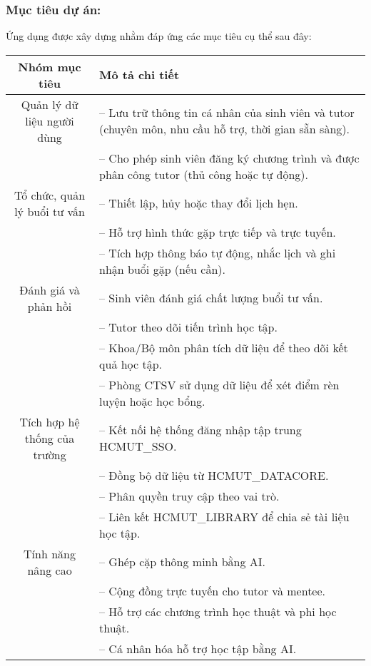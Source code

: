 \newpage

\subsubsection{Mục tiêu dự án:}
Ứng dụng được xây dựng nhằm đáp ứng các mục tiêu cụ thể sau đây:
\renewcommand{\arraystretch}{1.4} %
\begin{table}[H]
\centering
\begin{tabular}{|c|p{9.5cm}|}
\hline
\textbf{Nhóm mục tiêu} & \textbf{Mô tả chi tiết} \\
\hline
Quản lý dữ liệu người dùng &
-- Lưu trữ thông tin cá nhân của sinh viên và tutor (chuyên môn, nhu cầu hỗ trợ, thời gian sẵn sàng).\\
& -- Cho phép sinh viên đăng ký chương trình và được phân công tutor (thủ công hoặc tự động). \\
\hline
Tổ chức, quản lý buổi tư vấn &
-- Thiết lập, hủy hoặc thay đổi lịch hẹn.\\
& -- Hỗ trợ hình thức gặp trực tiếp và trực tuyến.\\
& -- Tích hợp thông báo tự động, nhắc lịch và ghi nhận buổi gặp (nếu cần). \\
\hline
Đánh giá và phản hồi &
-- Sinh viên đánh giá chất lượng buổi tư vấn.\\
& -- Tutor theo dõi tiến trình học tập.\\
& -- Khoa/Bộ môn phân tích dữ liệu để theo dõi kết quả học tập.\\
& -- Phòng CTSV sử dụng dữ liệu để xét điểm rèn luyện hoặc học bổng. \\
\hline
Tích hợp hệ thống của trường &
-- Kết nối hệ thống đăng nhập tập trung HCMUT\_SSO.\\
& -- Đồng bộ dữ liệu từ HCMUT\_DATACORE.\\
& -- Phân quyền truy cập theo vai trò.\\
& -- Liên kết HCMUT\_LIBRARY để chia sẻ tài liệu học tập. \\
\hline
Tính năng nâng cao &
-- Ghép cặp thông minh bằng AI.\\
& -- Cộng đồng trực tuyến cho tutor và mentee.\\
& -- Hỗ trợ các chương trình học thuật và phi học thuật.\\
& -- Cá nhân hóa hỗ trợ học tập bằng AI. \\
\hline
\end{tabular}
\end{table}